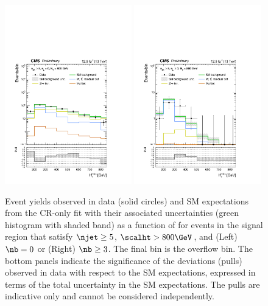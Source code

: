 \begin{figure}[!tbhp]
  \begin{center}
    \includegraphics[width=0.49\textwidth]{Figures/statisticalResults/mhtShape_eq0b_ge5j_800_Inf_fit_b.pdf} 
    \includegraphics[width=0.49\textwidth]{Figures/statisticalResults/mhtShape_ge3b_ge5j_800_Inf_fit_b.pdf} 
  \end{center}
  \caption{Event yields observed in data (solid circles) and SM
    expectations from the CR-only fit with their associated
    uncertainties (green histogram with shaded band) as a function of
    \mht for events in the signal region that satisfy $\njet \geq
    5$, $\scalht > 800\GeV$, and (Left) $\nb = 0$ or (Right) $\nb \geq
    3$. The final bin is the overflow bin. The bottom panels indicate
    the significance of the deviations (pulls) observed in data with respect
    to the SM expectations, expressed in terms of the total
    uncertainty in the SM expectations. The pulls are indicative only
    and cannot be considered independently.  
    \label{fig:mht-templates} 
  }
\end{figure}

